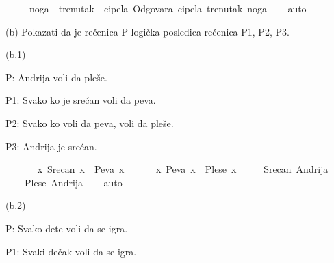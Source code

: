 \begin{isabellebody}
\begin{exercise}[subtitle=Zapisivanje logičkih formula (nastavak)]
\ \ \ \ {\isacharparenleft}{\kern0pt}{\isasymforall}\ noga{\isachardot}{\kern0pt}\ {\isasymexists}\ trenutak{\isachardot}{\kern0pt}\ {\isasymexists}\ cipela{\isachardot}{\kern0pt}\ Odgovara\ cipela\ trenutak\ noga{\isacharparenright}{\kern0pt}{\isachardoublequoteclose}\isanewline
%
\isadelimproof
\ \ %
\endisadelimproof
%
\isatagproof
{}\isamarkupfalse%
\ auto%
\endisatagproof
{\isafoldproof}%
%
\isadelimproof
%
\endisadelimproof
%
\begin{isamarkuptext}%
(b) Pokazati da je rečenica P logička posledica rečenica P1, P2, P3.%
\end{isamarkuptext}\isamarkuptrue%
%
\begin{isamarkuptext}%
(b.1)%
\end{isamarkuptext}\isamarkuptrue%
%
\begin{isamarkuptext}%
P:  Andrija voli da pleše.%
\end{isamarkuptext}\isamarkuptrue%
%
\begin{isamarkuptext}%
P1: Svako ko je srećan voli da peva.%
\end{isamarkuptext}\isamarkuptrue%
%
\begin{isamarkuptext}%
P2: Svako ko voli da peva, voli da pleše.%
\end{isamarkuptext}\isamarkuptrue%
%
\begin{isamarkuptext}%
P3: Andrija je srećan.%
\end{isamarkuptext}\isamarkuptrue%
\isamarkupfalse%
\ {\isachardoublequoteopen}\isanewline
\ \ \ \ {\isacharparenleft}{\kern0pt}{\isasymforall}\ x{\isachardot}{\kern0pt}\ Srecan\ x\ {\isasymlongrightarrow}\ Peva\ x{\isacharparenright}{\kern0pt}\ {\isasymand}\isanewline
\ \ \ \ {\isacharparenleft}{\kern0pt}{\isasymforall}\ x{\isachardot}{\kern0pt}\ Peva\ x\ {\isasymlongrightarrow}\ Plese\ x{\isacharparenright}{\kern0pt}\ {\isasymand}\isanewline
\ \ \ \ Srecan\ Andrija\ {\isasymlongrightarrow}\isanewline
\ \ \ \ Plese\ Andrija{\isachardoublequoteclose}\isanewline
%
\isadelimproof
\ \ %
\endisadelimproof
%
\isatagproof
{}\isamarkupfalse%
\ auto%
\endisatagproof
{\isafoldproof}%
%
\isadelimproof
%
\endisadelimproof
%
\begin{isamarkuptext}%
(b.2)%
\end{isamarkuptext}\isamarkuptrue%
%
\begin{isamarkuptext}%
P:  Svako dete voli da se igra.%
\end{isamarkuptext}\isamarkuptrue%
%
\begin{isamarkuptext}%
P1: Svaki dečak voli da se igra.%

\end{isamarkuptext}
\end{exercise}
\end{isabellebody}
